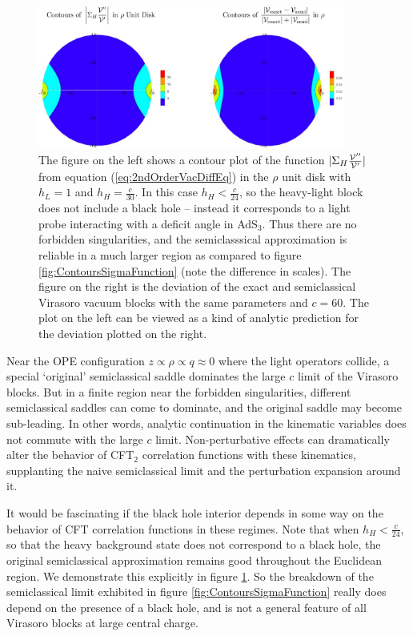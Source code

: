 \begin{figure}
\centering{}\includegraphics[width=0.9\textwidth]{virasoro_chapter/NoBHContours}
\caption{The figure on the left shows a contour plot of the function $|\Sigma_{H} \frac{{\cal V}''}{{\cal V}'}|$ from equation (\ref{eq:2ndOrderVacDiffEq}) in the $\rho$ unit disk with $h_L = 1$ and $h_H = \frac{c}{30}$.  In this case $h_H < \frac{c}{24}$, so the heavy-light block does not include a black hole -- instead it corresponds to a light probe interacting with a deficit angle in AdS$_3$.  Thus there are no forbidden singularities, and the semiclasssical approximation is reliable in a much larger region as compared to figure \ref{fig:ContoursSigmaFunction} (note the difference in scales).  The figure on the right is the deviation of the exact and semiclassical Virasoro vacuum blocks with the same parameters and $c = 60$.  The plot on the left can be viewed as a kind of analytic prediction for the deviation plotted on the right. }
\label{fig:NoBHContours}
\end{figure}

Near the OPE configuration $z \propto \rho \propto q \approx 0$ where the light operators collide, a special `original' semiclassical saddle dominates the large $c$ limit \cite{Fitzpatrick:2016ive} of the Virasoro blocks.  But in a finite region near the forbidden singularities, different semiclassical saddles \cite{Fitzpatrick:2016mjq} can come to dominate, and the original saddle may become sub-leading.  In other words, analytic continuation in the kinematic variables does not commute with the large $c$ limit.  Non-perturbative effects can dramatically alter the behavior of CFT$_2$ correlation functions with these kinematics, supplanting the naive semiclassical limit and the perturbation expansion around it.  

It would be fascinating if the black hole interior depends in some way on the behavior of CFT correlation functions in these regimes.  Note that when $h_H < \frac{c}{24}$, so that the heavy background state does not correspond to a black hole, the original semiclassical approximation remains good throughout the Euclidean region. We demonstrate this explicitly in figure \ref{fig:NoBHContours}.  So the breakdown of the semiclassical limit exhibited in figure \ref{fig:ContoursSigmaFunction} really does depend on the presence of a black hole, and is not a general feature of all Virasoro blocks at large central charge.



